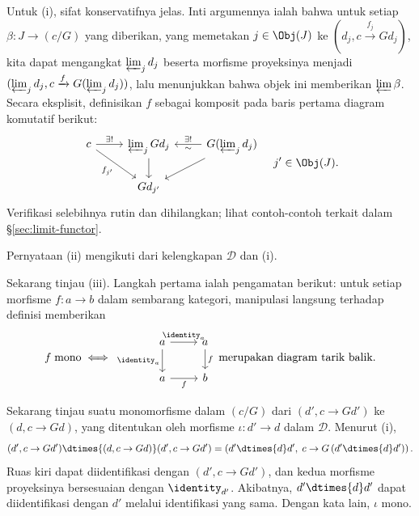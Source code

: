 \begin{bukti}
	Untuk (i), sifat konservatifnya jelas. Inti argumennya ialah bahwa untuk
	setiap $\beta:J\to(c/G)$ yang diberikan, yang memetakan
	$j\in\Obj(J)$ ke $(d_j,c\xrightarrow{f_j}Gd_j)$, kita dapat mengangkat
	$\varprojlim_jd_j$ beserta morfisme proyeksinya menjadi
	$(\varprojlim_jd_j,c\xrightarrow{f}G(\varprojlim_jd_j))$, lalu
	menunjukkan bahwa objek ini memberikan $\varprojlim\beta$. Secara
	eksplisit, definisikan $f$ sebagai komposit pada baris pertama diagram komutatif
	berikut:
	\[\begin{tikzcd}
		c \arrow[r, "{\exists!}"] \arrow[rd, "{f_{j'}}"'] & \varprojlim_j Gd_j \arrow[d] & G (\varprojlim_j d_j) \arrow[l, "\exists!"', "\sim"] \arrow[ld] \\
		& Gd_{j'} &
	\end{tikzcd} \quad j' \in \Obj(J). \]
	Verifikasi selebihnya rutin dan dihilangkan; lihat contoh-contoh
	terkait dalam \S\ref{sec:limit-functor}.

	Pernyataan (ii) mengikuti dari kelengkapan $\mathcal{D}$ dan (i).

	Sekarang tinjau (iii). Langkah pertama ialah pengamatan berikut: untuk
	setiap morfisme $f:a\to b$ dalam sembarang kategori, manipulasi langsung
	terhadap definisi memberikan
	\[ f \;\text{mono} \iff
	\begin{tikzcd}
		a \arrow[r, "\identity_a"] \arrow[d, "\identity_a"'] & a \arrow[d, "f"] \\
		a \arrow[r, "f"'] & b
	\end{tikzcd} \;\text{merupakan diagram tarik balik}. \]

	Sekarang tinjau suatu monomorfisme dalam $(c/G)$ dari
	$(d',c\to Gd')$ ke $(d,c\to Gd)$, yang ditentukan oleh morfisme
	$\iota:d'\to d$ dalam $\mathcal{D}$. Menurut (i),
	\[ (d', c \to Gd') \dtimes{(d, c \to Gd)} (d', c \to Gd') = \left( d' \dtimes{d} d' , \; c \to G\left( d' \dtimes{d} d' \right) \right) . \]
	Ruas kiri dapat diidentifikasi dengan $(d',c\to Gd')$, dan kedua morfisme
	proyeksinya bersesuaian dengan $\identity_{d'}$. Akibatnya,
	$d'\dtimes{d}d'$ dapat diidentifikasi dengan $d'$ melalui identifikasi yang sama.
	Dengan kata lain, $\iota$ mono.
\end{bukti}

